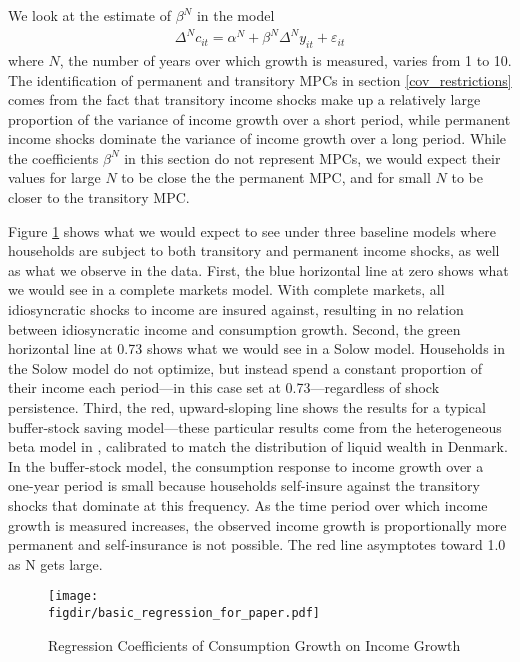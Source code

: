 \documentclass[titlepage]{\econtex}\newcommand{\texname}{ConsumptionHeterogeneity}
\newcommand{\figdir}{../Code/Rcode/Figures/AEJ_revision}
\begin{document}
	We look at the estimate of $\beta^N$ in the model
	\begin{align*}
	\Delta^N c_{it} = \alpha^N + \beta^N \Delta^N y_{it} + \varepsilon_{it}
	\end{align*}
	where $N$, the number of years over which growth is measured, varies from 1 to 10. The identification of permanent and transitory MPCs in section \ref{cov_restrictions} comes from the fact that transitory income shocks make up a relatively large proportion of the variance of income growth over a short period, while permanent income shocks dominate the variance of income growth over a long period. While the coefficients $\beta^N$ in this section do not represent MPCs, we would expect their values for large $N$ to be close the the permanent MPC, and for small $N$ to be closer to the transitory MPC. 
	
	Figure \ref{fig:GrowthReg} shows what we would expect to see under three baseline models where households are subject to both transitory and permanent income shocks, as well as what we observe in the data. First, the blue horizontal line at zero shows what we would see in a complete markets model. With complete markets, all idiosyncratic shocks to income are insured against, resulting in no relation between idiosyncratic income and consumption growth. Second, the green horizontal line at 0.73 shows what we would see in a Solow model. Households in the Solow model do not optimize, but instead spend a constant proportion of their income each period---in this case set at 0.73---regardless of shock persistence. Third, the red, upward-sloping line shows the results for a typical buffer-stock saving model---these particular results come from the heterogeneous beta model in \cite{carroll_distribution_2017}, calibrated to match the distribution of liquid wealth in Denmark. In the buffer-stock model, the consumption response to income growth over a one-year period is small because households self-insure against the transitory shocks that dominate at this frequency. As the time period over which income growth is measured increases, the observed income growth is proportionally more permanent and self-insurance is not possible. The red line asymptotes toward 1.0 as N gets large.
	\begin{figure} 
		\begin{centering}
			\texttt{[image: \\figdir/basic\_regression\_for\_paper.pdf]}
			\caption{Regression Coefficients of Consumption Growth on Income Growth}
			\label{fig:GrowthReg}
		\end{centering}
	\end{figure}
	
\end{document}
